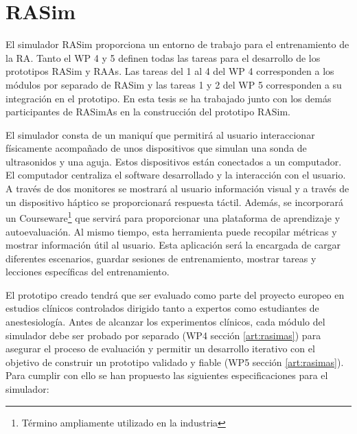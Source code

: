 \section{RASim}
\label{rasim:rasim}
El simulador \ac{RASim} proporciona un entorno de trabajo para el entrenamiento de la \ac{RA}. Tanto el \ac{WP} 4 y 5 definen todas las tareas para el desarrollo de los prototipos \ac{RASim} y \ac{RAAs}. Las tareas del 1 al 4 del \ac{WP} 4 corresponden a los módulos por separado de \ac{RASim} y las tareas 1 y 2 del \ac{WP} 5 corresponden a su integración en el prototipo. En esta tesis se ha trabajado junto con los demás participantes de \ac{RASimAs} en la construcción del prototipo \ac{RASim}. %

El simulador consta de un maniquí que permitirá al usuario interaccionar físicamente acompañado de unos dispositivos que simulan una sonda de ultrasonidos y una aguja. Estos dispositivos están conectados a un computador. El computador centraliza el software desarrollado y la interacción con el usuario. A través de dos monitores se mostrará al usuario información visual y a través de un dispositivo háptico se proporcionará respuesta táctil. Además, se incorporará un \ac{Courseware}\footnote{Término ampliamente utilizado en la industria } que servirá para proporcionar una plataforma de aprendizaje y autoevaluación. Al mismo tiempo, esta herramienta puede recopilar métricas y mostrar información útil al usuario. Esta aplicación será la encargada de cargar diferentes escenarios, guardar sesiones de entrenamiento, mostrar tareas y lecciones específicas del entrenamiento.

El prototipo creado tendrá que ser evaluado como parte del proyecto europeo en estudios clínicos controlados dirigido tanto a expertos como estudiantes de anestesiología. Antes de alcanzar los experimentos clínicos, cada módulo del simulador debe ser probado por separado (\ac{WP}4 sección \ref{art:rasimas}) para asegurar el proceso de evaluación y permitir un desarrollo iterativo con el objetivo de construir un prototipo validado y fiable (\ac{WP}5 sección \ref{art:rasimas}). Para cumplir con ello se han propuesto las siguientes especificaciones para el simulador:

